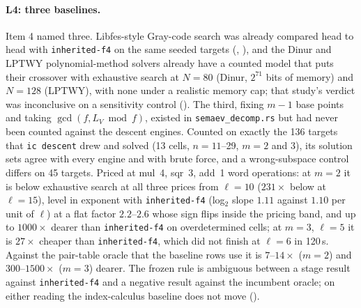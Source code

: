 \paragraph{L4: three baselines.} Item 4 named three. Libfes-style Gray-code
search was already compared head to head with \texttt{inherited-f4} on the
same seeded targets (,
), and the Dinur and LPTWY
polynomial-method solvers already have a counted model that puts their
crossover with exhaustive search at $N=80$ (Dinur, $2^{71}$ bits of memory)
and $N=128$ (LPTWY), with none under a realistic memory cap; that study's
verdict was inconclusive on a sensitivity control
(). The third, fixing $m-1$
base points and taking $\gcd(f,L_V\bmod f)$, existed in
\texttt{semaev\_decomp.rs} but had never been counted against the descent
engines. Counted on exactly the 136 targets that \texttt{ic descent} drew
and solved (13 cells, $n=11$--29, $m=2$ and 3), its solution sets agree
with every engine and with brute force, and a wrong-subspace control
differs on 45 targets. Priced at mul~4, sqr~3, add~1 word operations: at
$m=2$ it is below exhaustive search at all three prices from $\ell=10$
($231\times$ below at $\ell=15$), level in exponent with \texttt{inherited-f4} (log$_2$ slope
$1.11$ against $1.10$ per unit of $\ell$) at a flat factor $2.2$--$2.6$
whose sign flips inside the pricing band, and up to $1000\times$ dearer than
\texttt{inherited-f4} on overdetermined cells; at $m=3$, $\ell=5$ it is
$27\times$ cheaper than \texttt{inherited-f4}, which did not finish at
$\ell=6$ in 120\,s. Against the pair-table oracle that the baseline rows use
it is $7$--$14\times$ ($m=2$) and $300$--$1500\times$ ($m=3$) dearer. The
frozen rule is ambiguous between a stage result against
\texttt{inherited-f4} and a negative result against the incumbent oracle;
on either reading the index-calculus baseline does not move
().

